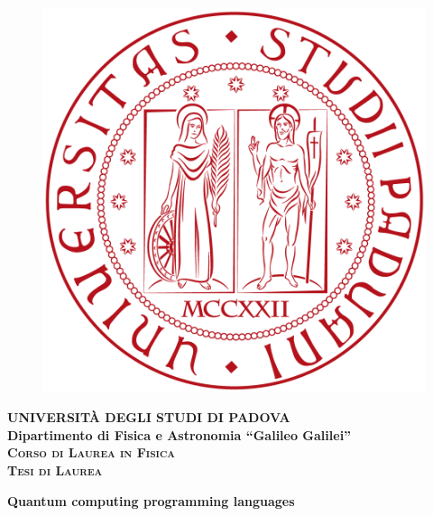 \documentclass[11pt, a4paper, twoside, openright]{book}
\renewcommand{\'}[0]{\`}
\theoremstyle{definition}
\begin{document}
\frontmatter
\begin{titlepage}
\vspace{5mm}
\begin{figure}[hbtp]
\centering
\includegraphics[scale=.13]{UNIPD.png}
\end{figure}
\vspace{5mm}
\begin{center}
{{\huge{\textsc{\bf UNIVERSIT\`A DEGLI STUDI DI PADOVA}}}\\}
\vspace{5mm}
{\Large{\bf Dipartimento di Fisica e Astronomia ``Galileo Galilei''}} \\
\vspace{5mm}
{\Large{\textsc{\bf Corso di Laurea in Fisica}}}\\
\vspace{20mm}
{\Large{\textsc{\bf Tesi di Laurea}}}\\
\vspace{30mm}
\begin{spacing}{3}
{\LARGE \textbf{Quantum computing programming languages}}\\
\end{spacing}
\vspace{8mm}
\end{center}


\end{titlepage}
\end{document}
